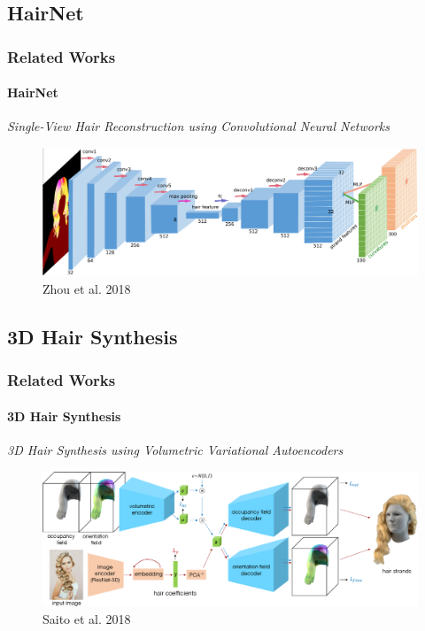 
\subsection{HairNet}
\begin{frame}\frametitle{Related Works}
    \framesubtitle{HairNet}

    \normalsize{\textcolor{myBlue}{\textit{Single-View Hair Reconstruction using Convolutional Neural Networks}}}
    
    \begin{figure}[ht]
        \centering
        \includegraphics[width=0.8\linewidth]{assets/figures/baselines/HairNet.png}
        \caption{Zhou et al. 2018\cite{Zhou2018SingleViewHR}}
        \label{fig:hairnet}
    \end{figure}
\end{frame}


\subsection{3D Hair Synthesis}
\begin{frame}\frametitle{Related Works}
    \framesubtitle{3D Hair Synthesis}

    \normalsize{\textcolor{myBlue}{\textit{3D Hair Synthesis using Volumetric Variational Autoencoders}}}
    
    \begin{figure}[ht]
        \centering
        \includegraphics[width=0.8\linewidth]{assets/figures/baselines/3DHairSynthesis.png}
        \caption{Saito et al. 2018\cite{Saito20183DHS}}
        \label{fig:3dhairsynthesis}
    \end{figure}
\end{frame}



